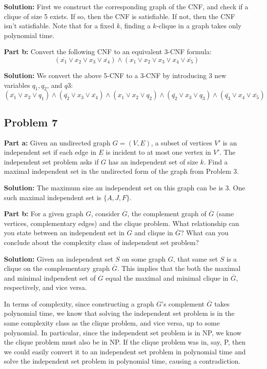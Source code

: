 \documentclass{article}
\begin{document}
\noindent\textbf{Solution:} First we construct the corresponding graph of the CNF, and check if a clique of size 5 exists. If so, then the CNF is satisfiable. If not, then the CNF isn't satisfiable. Note that for a fixed $k$, finding a $k$-clique in a graph takes only polynomial time.
\bigskip

\noindent\textbf{Part b:} Convert the following CNF to an equivalent 3-CNF formula:
$$(\overline{x_1}\vee x_2\vee x_3\vee \overline{x_4})\wedge(x_1\vee x_2\vee x_3\vee x_4\vee \overline{x_5})$$

\noindent\textbf{Solution:} We convert the above 5-CNF to a 3-CNF by introducing 3 new variables $q_1,q_2$, and $q3$:
$$(\overline{x_1}\vee x_2\vee q_1)\wedge(\overline{q_2}\vee x_3\vee \overline{x_4})\wedge(x_1\vee x_2\vee q_2)\wedge(\overline{q_2}\vee x_3\vee q_3)\wedge(\overline{q_3}\vee x_4\vee \overline{x_5})$$

\subsection*{Problem 7}
\noindent\textbf{Part a:} Given an undirected graph $G=(V, E)$, a subset of vertices $V'$ is an independent set if each edge in $E$ is incident to at most one vertex in $V'$. The independent set problem asks if $G$ has an independent set of size $k$. Find a maximal independent set in the undirected form of the graph from Problem 3.
\bigskip

\noindent\textbf{Solution:} The maximum size an independent set on this graph can be is 3. One such maximal independent set is $\{A,J,F\}$.
\bigskip

\noindent\textbf{Part b:} For a given graph $G$, consider $\overline{G}$, the complement graph of $\overline{G}$ (same vertices, complementary edges) and the clique problem. What relationship can you state between an independent set in $G$ and clique in $\overline{G}$? What can you conclude about the complexity class of independent set problem?
\bigskip

\noindent\textbf{Solution:} Given an independent set $S$ on some graph $G$, that same set $S$ is a clique on the complementary graph $\overline{G}$. This implies that the both the maximal and minimal indpendent set of $G$ equal the maximal and minimal clique in $\overline{G}$, respectively, and vice versa.

In terms of complexity, since constructing a graph $G$'s complement $\overline{G}$ takes polynomial time, we know that solving the independent set problem is in the same complexity class as the clique problem, and vice versa, up to some polynomial. In particular, since the independent set problem is in NP, we know the clique problem must also be in NP. If the clique problem was in, say, P, then we could easily convert it to an independent set problem in polynomial time and solve the independent set problem in polynomial time, causing a contradiction.
\end{document}
